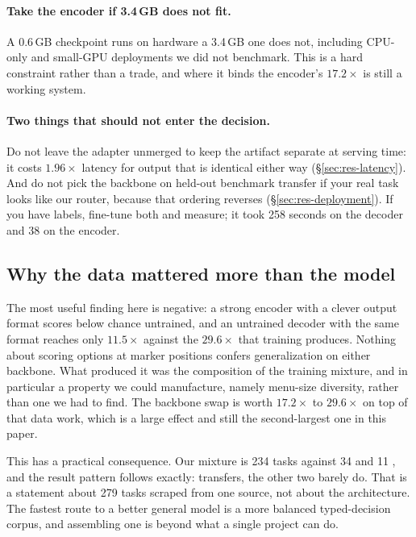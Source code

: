 \paragraph{Take the encoder if 3.4\,GB does not fit.} A 0.6\,GB
checkpoint runs on hardware a 3.4\,GB one does not, including CPU-only
and small-GPU deployments we did not benchmark. This is a hard constraint
rather than a trade, and where it binds the encoder's $17.2\times$ is
still a working system.

\paragraph{Two things that should not enter the decision.} Do not leave
the adapter unmerged to keep the artifact separate at serving time: it
costs $1.96\times$ latency for output that is identical either way
(\S\ref{sec:res-latency}). And do not pick the backbone on held-out
benchmark transfer if your real task looks like our router, because that
ordering reverses (\S\ref{sec:res-deployment}). If you have labels,
fine-tune both and measure; it took 258 seconds on the decoder and 38 on
the encoder.

\subsection{Why the data mattered more than the model}

The most useful finding here is negative: a strong encoder with a clever
output format scores below chance untrained, and an untrained decoder with
the same format reaches only $11.5\times$ against the $29.6\times$ that
training produces. Nothing about scoring options at marker positions
confers generalization on either backbone. What produced it was the
composition of the training mixture, and in particular a property we could
manufacture, namely menu-size diversity, rather than one we had to find.
The backbone swap is worth $17.2\times$ to $29.6\times$ on top of that
data work, which is a large effect and still the second-largest one in
this paper.

This has a practical consequence. Our mixture is 234 \choice{} tasks
against 34 \noul{} and 11 \score{}, and the result pattern follows exactly:
\choice{} transfers, the other two barely do. That is a statement about
279 tasks scraped from one source, not about the architecture. The
fastest route to a better general model is a more balanced typed-decision
corpus, and assembling one is beyond what a single project can do.

